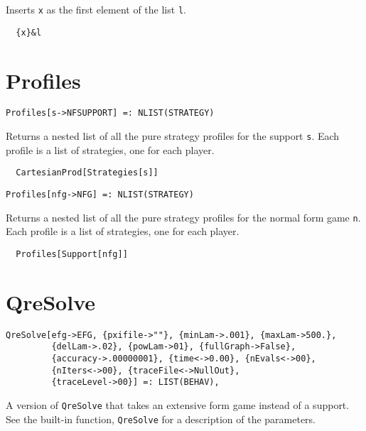 \noindent
Inserts \verb+x+ as the first element of the list \verb+l+.  

\udfbody
\begin{verbatim}
  {x}&l
\end{verbatim} 


\section*{Profiles}\label{ExtProfiles}
\begin{verbatim}
Profiles[s->NFSUPPORT] =: NLIST(STRATEGY) 
\end{verbatim}

\noindent
Returns a nested list of all the pure strategy profiles for the support
\verb+s+.  Each profile is a list of strategies, one for each player.  

\udfbody
\begin{verbatim}
  CartesianProd[Strategies[s]]
\end{verbatim} 

\newsignature

\begin{verbatim}
Profiles[nfg->NFG] =: NLIST(STRATEGY) 
\end{verbatim}

\noindent
Returns a nested list of all the pure strategy profiles for the normal
form game \verb+n+.  Each profile is a list of strategies, one for
each player.

\udfbody
\begin{verbatim}
  Profiles[Support[nfg]]
\end{verbatim} 


\section*{QreSolve}\label{ExtQreSolve}
\begin{verbatim}
QreSolve[efg->EFG, {pxifile->""}, {minLam->.001}, {maxLam->500.}, 
         {delLam->.02}, {powLam->01}, {fullGraph->False}, 
         {accuracy->.00000001}, {time<->0.00}, {nEvals<->00}, 
         {nIters<->00}, {traceFile<->NullOut}, 
         {traceLevel->00}] =: LIST(BEHAV),
\end{verbatim}

\noindent
A version of \verb+QreSolve+ that takes an extensive form
game instead of a support.  See the built-in function,
\verb+QreSolve+ for a description of the parameters.

